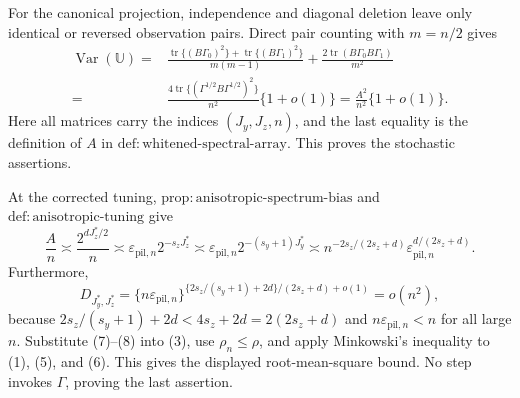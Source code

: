For the canonical projection, independence and diagonal deletion leave only identical or reversed observation pairs. Direct pair counting with \(m=n/2\) gives
\[
\begin{split}
\operatorname{Var}(\mathbb U)
={}&\frac{\operatorname{tr}\{(B\Gamma_0)^2\}+\operatorname{tr}\{(B\Gamma_1)^2\}}{m(m-1)}
+\frac{2\operatorname{tr}(B\Gamma_0B\Gamma_1)}{m^2}\\
={}&\frac{4\operatorname{tr}\{(\Gamma^{1/2}B\Gamma^{1/2})^2\}}{n^2}\{1+o(1)\}
=\frac{A^2}{n^2}\{1+o(1)\}.                                   \tag{6}
\end{split}
\]
Here all matrices carry the indices \((J_y,J_z,n)\), and the last equality is the definition of \(A\) in \(\mathrm{def{:}whitened\text{-}spectral\text{-}array}\). This proves the stochastic assertions.

At the corrected tuning, \(\mathrm{prop{:}anisotropic\text{-}spectrum\text{-}bias}\) and \(\mathrm{def{:}anisotropic\text{-}tuning}\) give
\[
\frac A n\asymp\frac{2^{dJ_z^*/2}}n
\asymp\varepsilon_{\mathrm{pil},n}2^{-s_zJ_z^*}
\asymp\varepsilon_{\mathrm{pil},n}2^{-(s_y+1)J_y^*}
\asymp n^{-2s_z/(2s_z+d)}\varepsilon_{\mathrm{pil},n}^{d/(2s_z+d)}. \tag{7}
\]
Furthermore,
\[
D_{J_y^*,J_z^*}
=\{n\varepsilon_{\mathrm{pil},n}\}^{\{2s_z/(s_y+1)+2d\}/(2s_z+d)+o(1)}=o(n^2), \tag{8}
\]
because \(2s_z/(s_y+1)+2d<4s_z+2d=2(2s_z+d)\) and \(n\varepsilon_{\mathrm{pil},n}<n\) for all large \(n\).  Substitute (7)--(8) into (3), use \(\rho_n\le\rho\), and apply Minkowski's inequality to (1), (5), and (6). This gives the displayed root-mean-square bound. No step invokes \(\widehat\Gamma\), proving the last assertion.